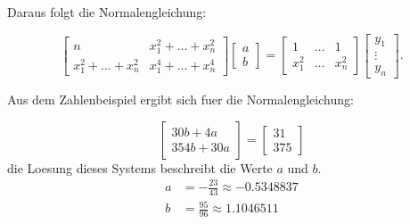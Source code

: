 \documentclass[11pt]{article}
\theoremstyle{plain}
\theoremstyle{definition}
\begin{document}
Daraus folgt die Normalengleichung:

\begin{equation}
\begin{bmatrix} n & x_1^2 + \dots + x_n^2 \\
  x_1^2 + \dots + x_n^2 & x_1^4 + \dots + x_n^4
\end{bmatrix} \begin{bmatrix} a \\ b \end{bmatrix}
= \begin{bmatrix} 1 & \dots & 1 \\ x_1^2 & \dots & x_n^2 \end{bmatrix} \begin{bmatrix} y_1 \\ \vdots \\ y_n \end{bmatrix}.
\end{equation}

Aus dem Zahlenbeispiel ergibt sich fuer die Normalengleichung:

\begin{equation}
\begin{bmatrix} 30b + 4a \\ 354b + 30a \end{bmatrix} = \begin{bmatrix} 31 \\ 375 \end{bmatrix}
\end{equation}
die Loesung dieses Systems beschreibt die Werte $a$ und $b$.
\begin{align}
  a &= -\frac{23}{43} \approx -0.5348837 \\
  b &= \frac{95}{96} \approx 1.1046511
\end{align}
\end{document}
